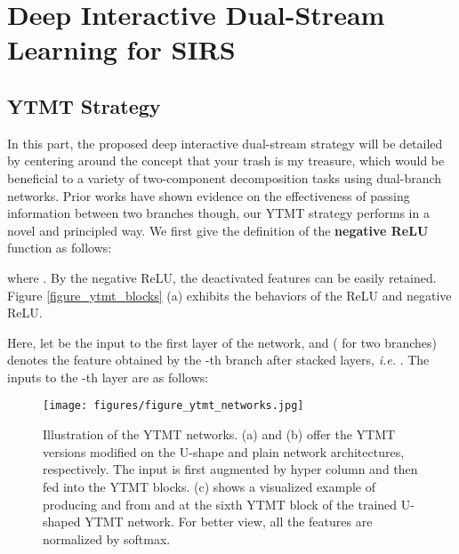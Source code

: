 \documentclass{article}
\begin{document}
\section{Deep Interactive Dual-Stream Learning for SIRS}
\subsection{YTMT Strategy}
In this part, the proposed deep interactive dual-stream strategy will be detailed by centering around the concept that your trash is my treasure, which would be beneficial to a variety of two-component decomposition tasks using dual-branch networks. Prior works \cite{li2019single, DBLP:conf/cvpr/WanSDTK18} have shown evidence on the effectiveness of passing information between two branches though, our YTMT strategy performs in a novel and principled way. We first give the definition of the \textbf{negative ReLU} function as follows:

where . By the negative ReLU, the deactivated features can be easily retained. Figure \ref{figure_ytmt_blocks} (a) exhibits the behaviors of the ReLU and negative ReLU. 


Here, let  be the input to the first layer of the network, and  ( for two branches) denotes the feature obtained by the -th branch after  stacked layers, \emph{i.e.} . The inputs to the -th layer are as follows:


\begin{figure}[t]
	\centering
	\texttt{[image: figures/figure\_ytmt\_networks.jpg]}
	\caption{Illustration of the YTMT networks. (a) and (b) offer the YTMT versions modified on the U-shape and plain network architectures, respectively. The input is first augmented by hyper column \cite{DBLP:conf/cvpr/ZhangNC18a} and then fed into the YTMT blocks. (c) shows a visualized example of producing  and  from  and  at the sixth YTMT block of the trained U-shaped YTMT network. For better view, all the features are normalized by softmax.}
	\label{arch}
\end{figure}
\end{document}
